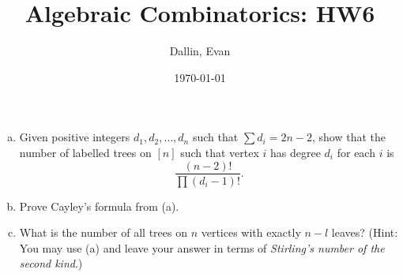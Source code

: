 \documentclass[11pt]{article}
\title{Algebraic Combinatorics: HW6}
\author{Dallin, Evan}
\date{\today}
\begin{document}
\maketitle
\begin{quest}[\textcolor{red}{Trees with prescribed degrees and Cayley's formula}]
    \begin{enumerate}[(a)]\phantom{0}
        
        \item Given positive integers $d_1,d_2,\dots,d_n$ such that $\sum d_i=2n-2$, show that the number of labelled trees on $[n]$ such that vertex $i$ has degree $d_i$ for each $i$ is \[\frac{(n-2)!}{\prod(d_i-1)!}.\]
        \item Prove Cayley's formula from (a).
        \item What is the number of all trees on $n$ vertices with exactly $n-l$ leaves? (Hint: You may use (a) and leave your answer in terms of \textit{Stirling's number of the second kind}.)
    \end{enumerate}
\end{quest}
\end{document}
